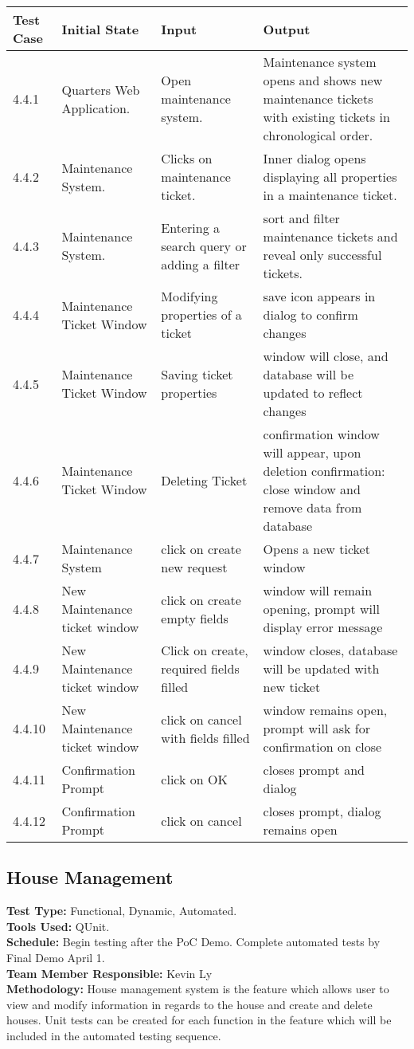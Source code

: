 \documentclass[12pt]{article}
\begin{document}
\begin{longtable}{|p{2cm}|p{3cm}|p{5cm}|p{5cm}|}
\hline
\textbf{Test Case}  & \textbf{Initial State} & \textbf{Input} & \textbf{Output} \\ \hline
4.4.1 & Quarters Web Application. & Open maintenance system. & Maintenance system opens and shows new maintenance tickets with existing tickets in chronological order. \\ 
\hline
4.4.2 & Maintenance System. & Clicks on maintenance ticket. & Inner dialog opens displaying all properties in a maintenance ticket. \\
\hline
4.4.3 & Maintenance System. & Entering a search query or adding a filter & sort and filter maintenance tickets and reveal only successful tickets. \\
\hline
4.4.4 & Maintenance Ticket Window & Modifying properties of a ticket & save icon appears in dialog to confirm changes\\
\hline
4.4.5 & Maintenance Ticket Window & Saving ticket properties & window will close, and database will be updated to reflect changes\\
\hline
4.4.6 & Maintenance Ticket Window & Deleting Ticket & confirmation window will appear, upon deletion confirmation: close window and remove data from database\\
\hline
4.4.7 & Maintenance System & click on create new request & Opens a new ticket window\\
\hline
4.4.8 & New Maintenance ticket window & click on create empty fields & window will remain opening, prompt will display error message\\
\hline
4.4.9 & New Maintenance ticket window & Click on create, required fields filled & window closes, database will be updated with new ticket\\
\hline
4.4.10 & New Maintenance ticket window & click on cancel with fields filled & window remains open, prompt will ask for confirmation on close\\
\hline
4.4.11 & Confirmation Prompt & click on OK & closes prompt and dialog \\
\hline
4.4.12 & Confirmation Prompt & click on cancel & closes prompt, dialog remains open\\
\hline
\end{longtable}

\subsection{House Management}
\textbf{Test Type:} Functional, Dynamic, Automated. \\
\textbf{Tools Used:} QUnit. \\
\textbf{Schedule:} Begin testing after the PoC Demo. Complete automated tests by Final Demo April 1. \\
\textbf{Team Member Responsible:} Kevin Ly\\
\textbf{Methodology:} House management system is the feature which allows user to view and modify information in regards to the house and create and delete houses. Unit tests can be created for each function in the feature which will be included in the automated testing sequence.
\end{document}
